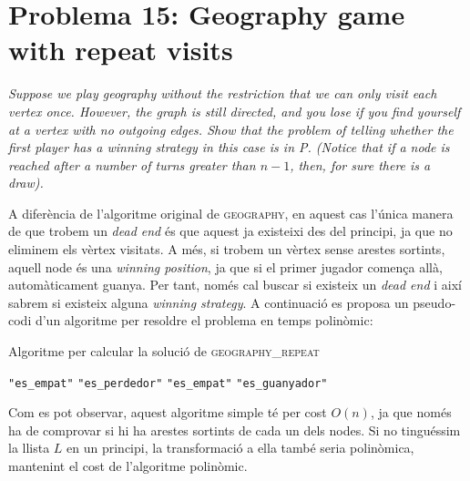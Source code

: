 \documentclass[a4paper]{article}
\begin{document}
\pagebreak
\section{Problema 15: Geography game with repeat visits}
\emph{Suppose we play geography without the restriction that we can only visit each vertex once. However, the graph is still directed, and you lose if you find yourself at a vertex with no outgoing edges. Show that the problem of telling whether the first player has a winning strategy in this case is in P. (Notice that if a node is reached after a number of turns greater than $n − 1$, then, for sure there is a draw).}

A diferència de l’algoritme original de \textsc{geography}, en aquest cas l'única manera de que trobem un \emph{dead end} és que aquest ja existeixi des del principi, ja que no eliminem els vèrtex visitats. A més, si  trobem un vèrtex sense arestes sortints, aquell node és una \emph{winning position}, ja que si el primer jugador comença allà, automàticament guanya. Per tant, només cal buscar si existeix un \emph{dead end} i així sabrem si existeix alguna \emph{winning strategy}. A continuació es proposa un pseudo-codi d'un algoritme per resoldre el problema en temps polinòmic:

\begin{algorithm}[H]
	\caption{Algoritme per calcular la solució de \textsc{geography\_repeat}}
	\begin{algorithmic}[1]
				\State \Return \texttt{"es\_empat"}
				\State \Return \texttt{"es\_perdedor"}
				\State \Return \texttt{"es\_empat"}
			\Else
				\State \Return \texttt{"es\_guanyador"}
			\EndIf
		\EndFunction
	\end{algorithmic}
\end{algorithm}

Com es pot observar, aquest algoritme simple té per cost $O(n)$, ja que només ha de comprovar si hi ha arestes sortints de cada un dels nodes. Si no tinguéssim la llista $L$ en un principi, la transformació a ella també seria polinòmica, mantenint el cost de l’algoritme polinòmic.
\end{document}
